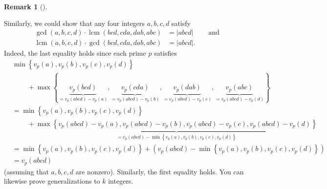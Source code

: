 \documentclass[numbers=enddot,12pt,final,onecolumn,notitlepage]{scrartcl}%
\numberwithin{exer}{subsection}
\theoremstyle{definition}
\newtheorem{remk}[theo]{Remark}
\newenvironment{remark}[1][]
{\begin{remk}[#1]\begin{leftbar}}
{\end{leftbar}\end{remk}}
\newenvironment{fineprint}{\begin{small}}{\end{small}}
\begin{document}
\begin{fineprint}
\begin{remark}
Similarly, we could show that any four integers $a,b,c,d$ satisfy
\begin{align*}
\gcd\left(  a,b,c,d\right)  \cdot\operatorname{lcm}\left(
bcd,cda,dab,abc\right)   &  =\left\vert abcd\right\vert
\ \ \ \ \ \ \ \ \ \ \text{and}\\
\operatorname{lcm}\left(  a,b,c,d\right)  \cdot\gcd\left(
bcd,cda,dab,abc\right)   &  =\left\vert abcd\right\vert .
\end{align*}
Indeed, the last equality holds since each prime $p$ satisfies%
\begin{align*}
&  \min\left\{  v_{p}\left(  a\right)  ,v_{p}\left(  b\right)  ,v_{p}\left(
c\right)  ,v_{p}\left(  d\right)  \right\} \\
&  \ \ \ \ \ \ \ \ \ \ +\max\left\{  \underbrace{v_{p}\left(  bcd\right)
}_{=v_{p}\left(  abcd\right)  -v_{p}\left(  a\right)  },\underbrace{v_{p}%
\left(  cda\right)  }_{=v_{p}\left(  abcd\right)  -v_{p}\left(  b\right)
},\underbrace{v_{p}\left(  dab\right)  }_{=v_{p}\left(  abcd\right)
-v_{p}\left(  c\right)  },\underbrace{v_{p}\left(  abc\right)  }%
_{=v_{p}\left(  abcd\right)  -v_{p}\left(  d\right)  }\right\} \\
&  =\min\left\{  v_{p}\left(  a\right)  ,v_{p}\left(  b\right)  ,v_{p}\left(
c\right)  ,v_{p}\left(  d\right)  \right\} \\
&  \ \ \ \ \ \ \ \ \ \ +\underbrace{\max\left\{  v_{p}\left(  abcd\right)
-v_{p}\left(  a\right)  ,v_{p}\left(  abcd\right)  -v_{p}\left(  b\right)
,v_{p}\left(  abcd\right)  -v_{p}\left(  c\right)  ,v_{p}\left(  abcd\right)
-v_{p}\left(  d\right)  \right\}  }_{=v_{p}\left(  abcd\right)  -\min\left\{
v_{p}\left(  a\right)  ,v_{p}\left(  b\right)  ,v_{p}\left(  c\right)
,v_{p}\left(  d\right)  \right\}  }\\
&  =\min\left\{  v_{p}\left(  a\right)  ,v_{p}\left(  b\right)  ,v_{p}\left(
c\right)  ,v_{p}\left(  d\right)  \right\}  +\left(  v_{p}\left(  abcd\right)
-\min\left\{  v_{p}\left(  a\right)  ,v_{p}\left(  b\right)  ,v_{p}\left(
c\right)  ,v_{p}\left(  d\right)  \right\}  \right) \\
&  =v_{p}\left(  abcd\right)
\end{align*}
(assuming that $a,b,c,d$ are nonzero). Similarly, the first equality holds.
You can likewise prove generalizations to $k$ integers.\footnotemark
\end{remark}


\end{fineprint}
\end{document}
